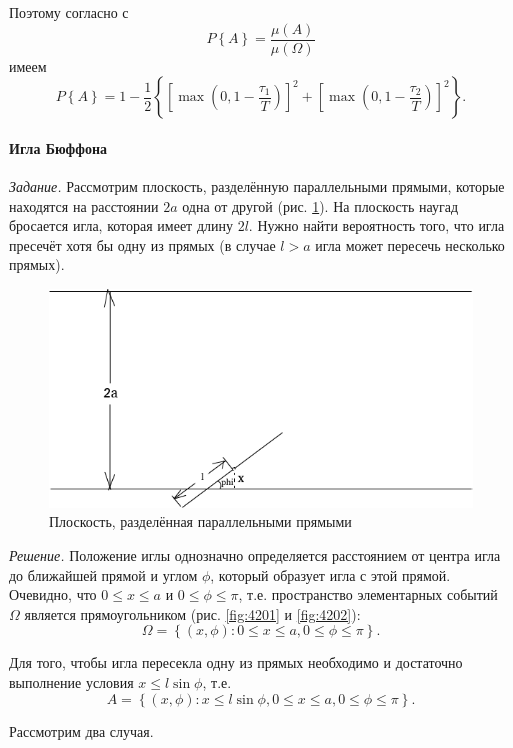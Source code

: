 Поэтому согласно с
$$P \left\{ A \right\} =
\frac{ \mu \left( A \right) }{ \mu \left( \Omega \right) }$$
имеем
$$P \left\{ A \right\} =
1 - \frac{1}{2} \left\{ \left[ \max \left( 0, 1 - \frac{ \tau_1}{T} \right) \right]^2 + \left[ \max \left( 0, 1 - \frac{ \tau_2}{T} \right) \right]^2 \right\}.$$

\paragraph*{Игла Бюффона}

\textit{Задание.} Рассмотрим плоскость, разделённую параллельными прямыми, которые находятся на расстоянии $2a$ одна от другой (рис. \ref{fig:42}).
На плоскость наугад бросается игла, которая имеет длину $2l$.
Нужно найти вероятность того, что игла пресечёт хотя бы одну из прямых (в случае $l > a$ игла может пересечь несколько прямых).

\begin{figure}[h!]
  \centering
  \includegraphics[width=.9\textwidth]{./pictures/4_2.png}
  \caption{Плоскость, разделённая параллельными прямыми}
  \label{fig:42}
\end{figure}

\textit{Решение.}  Положение иглы однозначно определяется расстоянием от центра игла до ближайшей прямой и углом $ \phi $, который образует игла с этой прямой.
Очевидно, что $0 \leq x \leq a$ и $0 \leq \phi \leq \pi $, т.е. пространство элементарных событий $ \Omega $ является прямоугольником (рис. \ref{fig:4201} и \ref{fig:4202}):
$$ \Omega =
\left\{ \left( x, \phi \right):
0 \leq x \leq a,
0 \leq \phi \leq \pi \right\}.$$

Для того, чтобы игла пересекла одну из прямых необходимо и достаточно выполнение условия
$x \leq l \sin \phi$, т.е.
$$A =
\left\{ \left( x, \phi \right):
x \leq l \sin \phi,
0 \leq x \leq a,
0 \leq \phi \leq \pi \right\}.$$

Рассмотрим два случая.

